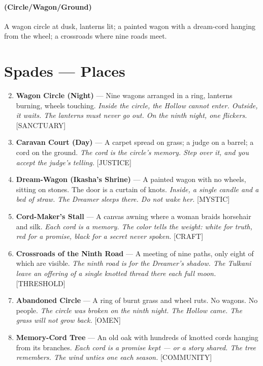 \paragraph*{(Circle/Wagon/Ground)} A wagon circle at dusk, lanterns lit; a painted wagon with a dream-cord hanging from the wheel; a crossroads where nine roads meet.

\section*{Spades --- Places}
\label{sec:tulkani-places}
\begin{enumerate}
\setcounter{enumi}{1}
\item \textbf{Wagon Circle (Night)} --- Nine wagons arranged in a ring, lanterns burning, wheels touching.
  \hfill \textit{Inside the circle, the Hollow cannot enter. Outside, it waits. The lanterns must never go out. On the ninth night, one flickers.} [SANCTUARY]
\item \textbf{Caravan Court (Day)} --- A carpet spread on grass; a judge on a barrel; a cord on the ground.
  \hfill \textit{The cord is the circle's memory. Step over it, and you accept the judge's telling.} [JUSTICE]
\item \textbf{Dream-Wagon (Ikasha's Shrine)} --- A painted wagon with no wheels, sitting on stones. The door is a curtain of knots.
  \hfill \textit{Inside, a single candle and a bed of straw. The Dreamer sleeps there. Do not wake her.} [MYSTIC]
\item \textbf{Cord-Maker's Stall} --- A canvas awning where a woman braids horsehair and silk.
  \hfill \textit{Each cord is a memory. The color tells the weight: white for truth, red for a promise, black for a secret never spoken.} [CRAFT]
\item \textbf{Crossroads of the Ninth Road} --- A meeting of nine paths, only eight of which are visible.
  \hfill \textit{The ninth road is for the Dreamer's shadow. The Tulkani leave an offering of a single knotted thread there each full moon.} [THRESHOLD]
\item \textbf{Abandoned Circle} --- A ring of burnt grass and wheel ruts. No wagons. No people.
  \hfill \textit{The circle was broken on the ninth night. The Hollow came. The grass will not grow back.} [OMEN]
\item \textbf{Memory-Cord Tree} --- An old oak with hundreds of knotted cords hanging from its branches.
  \hfill \textit{Each cord is a promise kept --- or a story shared. The tree remembers. The wind unties one each season.} [COMMUNITY]

\end{enumerate}
